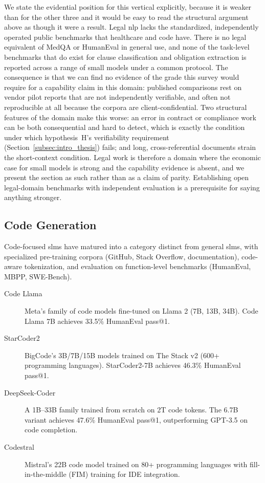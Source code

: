 We state the evidential position for this vertical explicitly, because it is
weaker than for the other three and it would be easy to read the structural
argument above as though it were a result. Legal \gls{nlp} lacks the standardized,
independently operated public benchmarks that healthcare and code have. There is
no legal equivalent of MedQA or HumanEval in general use, and none of the
task-level benchmarks that do exist for clause classification and obligation
extraction is reported across a range of small models under a common protocol.
The consequence is that we can find no evidence of the grade this survey would
require for a capability claim in this domain: published comparisons rest on
vendor pilot reports that are not independently verifiable, and often not
reproducible at all because the corpora are client-confidential. Two structural
features of the domain make this worse: an error in contract or compliance work
can be both consequential and hard to detect, which is exactly the condition
under which hypothesis~H's verifiability requirement (Section~\ref{subsec:intro_thesis})
fails; and long, cross-referential documents strain the short-context condition.
Legal work is therefore a domain where the economic case for small models is
strong and the capability evidence is absent, and we present the section as such
rather than as a claim of parity. Establishing open legal-domain benchmarks with
independent evaluation is a prerequisite for saying anything stronger.

\subsection{Code Generation}
\label{subsec:applications_code}

Code-focused \glspl{slm} have matured into a category distinct from general \glspl{slm}, with specialized pre-training corpora (GitHub, Stack Overflow, documentation), code-aware tokenization, and evaluation on function-level benchmarks (HumanEval, MBPP, SWE-Bench).

\begin{description}
    \item[Code Llama \citep{roziere2023codellama}] Meta's family of code models fine-tuned on Llama 2 (7B, 13B, 34B). Code Llama 7B achieves 33.5\% HumanEval pass@1.

    \item[StarCoder2 \citep{lozhkov2024starcoder2}] BigCode's 3B/7B/15B models trained on The Stack v2 (600+ programming languages). StarCoder2-7B achieves 46.3\% HumanEval pass@1.

    \item[DeepSeek-Coder \citep{zhu2024deepseek_coder}] A 1B--33B family trained from scratch on 2T code tokens. The 6.7B variant achieves 47.6\% HumanEval pass@1, outperforming GPT-3.5 on code completion.

    \item[Codestral \citep{mistral2024codestral}] Mistral's 22B code model trained on 80+ programming languages with fill-in-the-middle (FIM) training for IDE integration.
\end{description}


